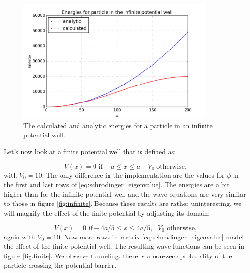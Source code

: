 \documentclass[a4paper]{article}
\begin{document}
\begin{figure}
\centering
\includegraphics[width=10cm]{energies}
\caption{The calculated and analytic energies for a particle in an infinite potential well.}
\label{fig:energies}
\end{figure}

Let's now look at a finite potential well that is defined as:

\begin{equation}
    V(x) = 0 \text{ if} -a \leq x \leq a, \text{ $V_0$ otherwise},
\end{equation}
with $V_0 = 10$. The only difference in the implementation are the values for $\phi$ in the first and last rows of \ref{eq:schrodinger_eigenvalue}. The energies are a bit higher than for the infinite potential well and the wave equations are very similar to those in figure 
\ref{fig:infinite}. Because these results are rather uninteresting, we will magnify the effect of the finite potential by adjusting its domain:

\begin{equation} \label{eq:finite_pot}
    V(x) = 0 \text{ if} -4a/5 \leq x \leq 4a/5, \text{ $V_0$ otherwise},
\end{equation}
again with $V_0=10$. Now more rows in matrix \ref{eq:schrodinger_eigenvalue} model the effect of the finite potential well. The resulting wave functions can be seen in figure \ref{fig:finite}. We observe tunneling: there is a non-zero probability of the particle crossing the potential barrier.
\end{document}
